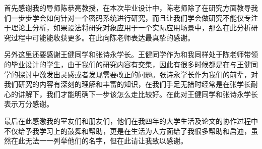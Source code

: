 
\begin{thanks}

首先感谢我的导师陈恭亮教授，在本次毕业设计中，陈老师除了在研究方面教导我们一步步学会如何针对一个密码系统进行研究，而且让我们学会做研究不能仅专注于理论上分析，如果设法将研究对象应用于一个实际应用场景中，那么在此分析研究过程中可能能收获更多。在此向陈老师表达最真挚的感谢。

另外这里还要感谢王健同学和张诗永学长。王健同学作为和我同样处于陈老师带领的毕业设计的学生，由于我们的研究内容有交集，因此有很多时候都是在与王健同学的探讨中激发出灵感或者发现需要改正的问题。张诗永学长作为我们的前辈，对我们研究的内容有深刻的理解和丰富的知识，在我们手足无措时经常是在张学长耐心的讲解下，我们才能明确下一步该怎么走比较好。在此对王健同学和张诗永学长表示万分感谢。

最后在此感激我的室友们和朋友们，他们在我四年的大学生活及论文的协作过程中不仅给予我学习上的鼓舞和帮助，更是在生活为人方面给了我很多帮助和启迪，虽然在此无法一一列举他们的名字，但在此请让我致以感谢。

\end{thanks}
